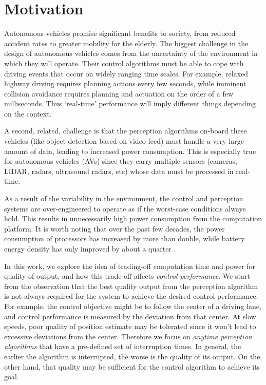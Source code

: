 \section{Motivation}
\label{sec:motivation}

Autonomous vehicles promise significant benefits to society, from reduced accident rates to greater mobility for the elderly. 
The biggest challenge in the design of autonomous vehicles comes from the uncertainty of the environment in which they will operate. 
Their control algorithms must be able to cope with driving events that occur on widely ranging time scales. 
For example, relaxed highway driving requires planning actions every few seconds, while imminent collision avoidance requires planning and actuation on the order of a few milliseconds.
Thus `real-time' performance will imply different things depending on the context. 

A second, related, challenge is that the perception algorithms on-board these vehicles (like object detection based on video feed) must handle a very large amount of data, leading to increased power consumption. 
This is especially true for autonomous vehicles (AVs) since they carry multiple sensors (cameras, LIDAR, radars, ultrasound radars, etc) whose data must be processed in real-time.

As a result of the variability in the environment, the control and perception systems are over-engineered to operate as if the worst-case conditions always hold. 
This results in unnecessarily high power consumption from the computation platform. It is worth noting that over the past few decades, the power consumption of processors has increased by more than double, while battery energy density has only improved by about a quarter \cite{Lahiri}. 



In this work, we explore the idea of trading-off computation time and power for quality of output, and how this trade-off affects \emph{control performance}.
We start from the observation that the best quality output from the perception algorithm is not always required for the system to achieve the desired control performance.
For example, the control objective might be to follow the center of a driving lane, and control performance is measured by the deviation from that center.
At slow speeds, poor quality of position estimate may be tolerated since it won't lead to excessive deviations from the center.
Therefore we focus on \emph{anytime perception algorithms} that have a pre-defined set of interruption times. 
In general, the earlier the algorithm is interrupted, the worse is the quality of its output. 
On the other hand, that quality may be sufficient for the control algorithm to achieve its goal.

